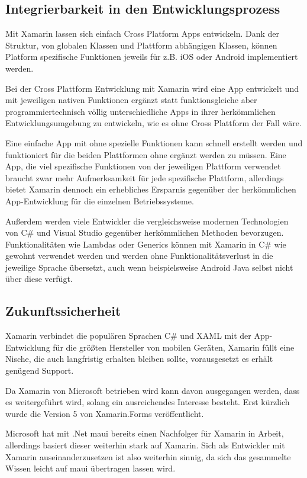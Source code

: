 \documentclass[12pt]{article}
\begin{document}
\subsection{Integrierbarkeit in den Entwicklungsprozess}

Mit Xamarin lassen sich einfach Cross Platform Apps entwickeln. Dank der Struktur, von globalen Klassen und Plattform abhängigen Klassen, können Platform spezifische Funktionen jeweils für z.B. iOS oder Android implementiert werden.

Bei der Cross Plattform Entwicklung mit Xamarin wird eine App entwickelt und mit jeweiligen nativen Funktionen ergänzt statt funktionsgleiche aber programmiertechnisch völlig unterschiedliche Apps in ihrer herkömmlichen Entwicklungsumgebung zu entwickeln, wie es ohne Cross Plattform der Fall wäre.

Eine einfache App mit ohne spezielle Funktionen kann schnell erstellt werden und funktioniert für die beiden Plattformen ohne ergänzt werden zu müssen. Eine App, die viel spezifische Funktionen von der jeweiligen Plattform verwendet braucht zwar mehr Aufmerksamkeit für jede spezifische Plattform, allerdings bietet Xamarin dennoch ein erhebliches Ersparnis gegenüber der herkömmlichen App-Entwicklung für die einzelnen Betriebssysteme.

Außerdem werden viele Entwickler die vergleichsweise modernen Technologien von C\# und Visual Studio gegenüber herkömmlichen Methoden bevorzugen. Funktionalitäten wie Lambdas oder Generics können mit Xamarin in C\# wie gewohnt verwendet werden und werden ohne Funktionalitätsverlust in die jeweilige Sprache übersetzt, auch wenn beispielsweise Android Java selbst nicht über diese verfügt.


\subsection{Zukunftssicherheit}
Xamarin verbindet die populären Sprachen C\# und XAML mit der App-Entwicklung für die größten Hersteller von mobilen Geräten, Xamarin füllt eine Nische, die auch langfristig erhalten bleiben sollte, vorausgesetzt es erhält genügend Support.

Da Xamarin von Microsoft betrieben wird kann davon ausgegangen werden, dass es weitergeführt wird, solang ein ausreichendes Interesse besteht. Erst kürzlich wurde die Version 5 von Xamarin.Forms veröffentlicht.

Microsoft hat mit .Net maui bereits einen Nachfolger für Xamarin in Arbeit, allerdings basiert dieser weiterhin stark auf Xamarin. Sich als Entwickler mit Xamarin auseinanderzusetzen ist also weiterhin sinnig, da sich das gesammelte Wissen leicht auf maui übertragen lassen wird.
\end{document}

